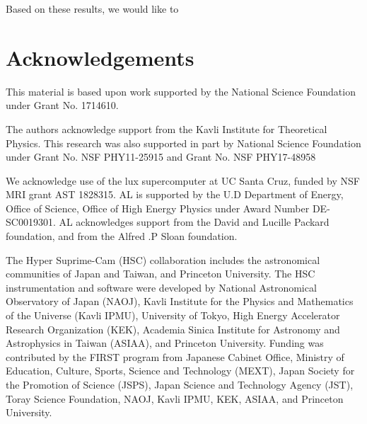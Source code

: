 \documentclass[a4paper,fleqn,usenatbib]{mnras}
\begin{document}

    Based on these results, we would like to

\section*{Acknowledgements}


  This material is based upon work supported by the National Science Foundation under
  Grant No. 1714610.

  The authors acknowledge support from the Kavli Institute for Theoretical Physics.
  This research was also supported in part by National Science Foundation under Grant
  No. NSF PHY11-25915 and Grant No. NSF PHY17-48958

  We acknowledge use of the lux supercomputer at UC Santa Cruz, funded by NSF MRI grant AST
  1828315. AL is supported by the U.D Department of Energy, Office of Science, Office of High
  Energy Physics under Award Number DE-SC0019301. AL acknowledges support from the David and
  Lucille Packard foundation, and from the Alfred .P Sloan foundation.

  The Hyper Suprime-Cam (HSC) collaboration includes the astronomical communities of
  Japan and Taiwan, and Princeton University.  The HSC instrumentation and software were
  developed by National Astronomical Observatory of Japan (NAOJ), Kavli Institute
  for the Physics and Mathematics of the Universe (Kavli IPMU), University of Tokyo,
  High Energy Accelerator Research Organization (KEK), Academia Sinica Institute
  for Astronomy and Astrophysics in Taiwan (ASIAA), and Princeton University.
  Funding was contributed by the FIRST program from Japanese Cabinet Office,  Ministry
  of Education, Culture, Sports, Science and Technology (MEXT), Japan Society for
  the Promotion of Science (JSPS), Japan Science and Technology Agency (JST), Toray
  Science Foundation, NAOJ, Kavli IPMU, KEK, ASIAA, and Princeton University.
\end{document}
